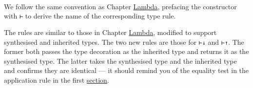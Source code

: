 \begin{fence}
\begin{code}
\>[4]%
\>[494I]\AgdaSpace{}%
\AgdaOperator{\AgdaInductiveConstructor{,}}\AgdaSpace{}%
\AgdaSpace{}%
\AgdaSpace{}%
\AgdaSpace{}%
\AgdaSpace{}%
\AgdaSpace{}%
\AgdaSpace{}%
\<%
\\
\>[.][@{}l@{}]\<[494I]%
\>[6]\AgdaComment{-----------------}\<%
\\
%
\>[4]\AgdaSpace{}%
\AgdaSpace{}%
\AgdaSpace{}%
\AgdaSpace{}%
\AgdaSpace{}%
\AgdaSpace{}%
\AgdaSpace{}%
\AgdaSpace{}%
\<%
\\
%
\\[\AgdaEmptyExtraSkip]%
%
\>[2]\AgdaSpace{}%
\AgdaSymbol{:}\AgdaSpace{}%
\AgdaSpace{}%
\AgdaSymbol{\{}\AgdaSpace{}%
\AgdaSpace{}%
\AgdaSpace{}%
\AgdaSymbol{\}}\<%
\\
\>[2][@{}l@{\AgdaIndent{0}}]%
\>[4]\AgdaSpace{}%
\AgdaSpace{}%
\AgdaSpace{}%
\AgdaSpace{}%
\AgdaSpace{}%
\<%
\\
%
\>[4]%
\>[522I]\AgdaSpace{}%
\AgdaSpace{}%
\<%
\\
\>[.][@{}l@{}]\<[522I]%
\>[6]\AgdaComment{-------------}\<%
\\
%
\>[4]\AgdaSpace{}%
\AgdaSpace{}%
\AgdaSpace{}%
\AgdaSymbol{(}\AgdaSpace{}%
\AgdaSymbol{)}\AgdaSpace{}%
\AgdaSpace{}%
\<%
\end{code}
\end{fence}

We follow the same convention as Chapter
\protect\hyperlink{Lambda}{Lambda}, prefacing the constructor with
\texttt{⊢} to derive the name of the corresponding type rule.

The rules are similar to those in Chapter
\protect\hyperlink{Lambda}{Lambda}, modified to support synthesised and
inherited types. The two new rules are those for \texttt{⊢↓} and
\texttt{⊢↑}. The former both passes the type decoration as the inherited
type and returns it as the synthesised type. The latter takes the
synthesised type and the inherited type and confirms they are identical
--- it should remind you of the equality test in the application rule in
the first \protect\hyperlink{Inference-algorithms}{section}.

